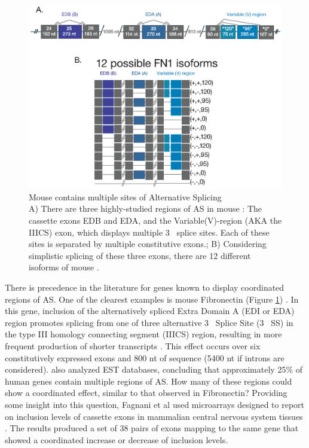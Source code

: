 \begin{figure}[htbp]
	\centering 
	\includegraphics{Figures/Chapter1/Fibronectin.eps}
	\caption[Mouse \fn{} contains multipe sites of Alternative Splicing]
	{
		Mouse \fn{} contains multiple sites of Alternative Splicing\\[0.25cm]
		A) There are three highly-studied regions of AS in mouse \fn{}: The cassette exons EDB and EDA, and the Variable(V)-region (AKA the IIICS) exon, which displays multiple 3\textprime~ splice sites.  Each of these sites is separated by multiple constitutive exons.; B) Considering simplistic splicing of these three exons, there are 12 different isoforms of mouse \fn{}.
	}
	\label{fig:mouseFn1}
\end{figure}

There is precedence in the literature for genes known to display coordinated regions of AS. One of the clearest examples is mouse Fibronectin \fn{} (Figure \ref{fig:mouseFn1}) \citep{Schwarzbauer1983, White2011a}. In this gene, inclusion of the alternatively spliced Extra Domain A (EDI or EDA) region promotes splicing from one of three alternative 3\textprime~ Splice Site (3\textprime~ SS) in the type III homology connecting segment (IIICS) region, resulting in more frequent production of shorter transcripts \citep{Fededa2005}. This effect occurs over six constitutively expressed exons and 800 nt of sequence (5400 nt if introns are considered). \citep{Fededa2005} also analyzed EST databases, concluding that approximately 25\% of human genes contain multiple regions of AS. How many of these regions could show a coordinated effect, similar to that observed in Fibronectin? Providing some insight into this question, Fagnani et al used microarrays designed to report on inclusion levels of cassette exons in mammalian central nervous system tissues \citep{Fagnani2007}. The results produced a set of 38 pairs of exons mapping to the same gene that showed a coordinated increase or decrease of inclusion levels. 


